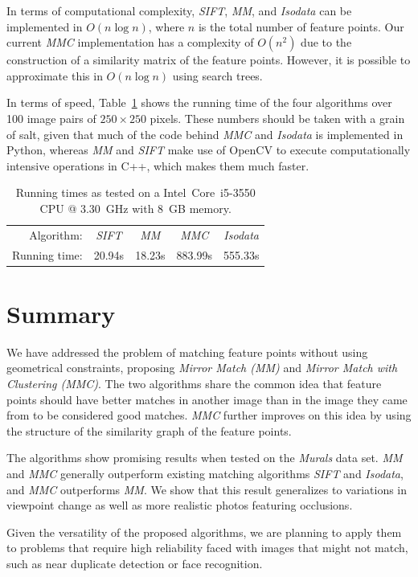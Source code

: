 \documentclass[conference]{IEEEtran}
\begin{document}
In terms of computational complexity, \emph{SIFT}, \emph{MM}, and \emph{Isodata} can be 
implemented in $O(n\log n)$, where $n$ is the total number of feature 
points.  Our current \emph{MMC} implementation has a complexity of $O(n^2)$ due to the 
construction of a similarity matrix of the feature points. However, it is 
possible to approximate this in $O(n\log n)$ using search trees.  

In terms of speed, Table~\ref{table:running_times} shows the 
running time of the four algorithms over 100 image pairs of $250\!\times\!250$ pixels. 
These numbers should be taken with a grain of salt, given that 
much of the code behind \emph{MMC} and \emph{Isodata} is implemented in 
Python, whereas \emph{MM} and \emph{SIFT} make use of OpenCV to execute 
computationally intensive operations in C++, which makes them much 
faster. 

\begin{table}[htb]
\caption{Running times as tested on a Intel\textregistered\ Core\texttrademark\ i5-3550 CPU @ 
3.30~GHz with 8~GB memory.}
\label{table:running_times}
	\centering
\begin{tabular}{r*{4}{c}}
\hline
	Algorithm: & \emph{SIFT} & \emph{MM} & \emph{MMC} & \emph{Isodata} 
	\\
	\noalign{\smallskip} 
	Running time: & 20.94s & 18.23s & 883.99s & 555.33s \\
	\hline
\end{tabular}
\end{table}
%

\section{Summary}
\label{S:Summary}

We have addressed the problem of matching feature points without using 
geometrical constraints, proposing \emph{Mirror Match 
(MM)} and \emph{Mirror Match with Clustering (MMC)}.  The two algorithms 
share the common idea that feature points should have better 
matches in another image than in the image they came from to be 
considered good matches.  \emph{MMC} further improves on this idea by 
using the structure of the similarity graph of the feature points. 

The algorithms show promising results when tested on the \emph{Murals} data 
set. %
\emph{MM} and \emph{MMC} 
generally outperform existing matching algorithms \emph{SIFT} and \emph{Isodata}, and \emph{MMC} 
outperforms \emph{MM}. We show that this result generalizes to 
variations in viewpoint change as well as more realistic photos featuring occlusions. 

Given the versatility of the proposed algorithms, we are planning to apply them to problems that require high 
reliability faced with images that might not match, such as near 
duplicate detection or face recognition.
%


\end{document}
